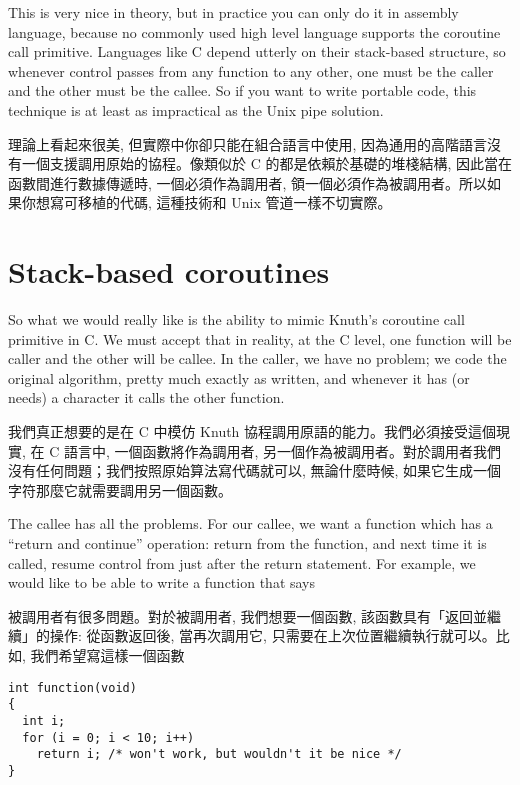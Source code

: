 \documentclass[12pt]{article}
\begin{document}
\begin{CJK}{UTF8}{bsmi}
 This is very nice in theory, but in practice you can only do it in assembly language, because no commonly used high level language supports the coroutine call primitive. Languages like C depend utterly on their stack-based structure, so whenever control passes from any function to any other, one must be the caller and the other must be the callee. So if you want to write portable code, this technique is at least as impractical as the Unix pipe solution.

理論上看起來很美, 但實際中你卻只能在組合語言中使用, 因為通用的高階語言沒有一個支援調用原始的協程。像類似於 C 的都是依賴於基礎的堆棧結構, 因此當在函數間進行數據傳遞時, 一個必須作為調用者, 領一個必須作為被調用者。所以如果你想寫可移植的代碼, 這種技術和 Unix 管道一樣不切實際。

\section{Stack-based coroutines}

So what we would really like is the ability to mimic Knuth's coroutine call primitive in C. We must accept that in reality, at the C level, one function will be caller and the other will be callee. In the caller, we have no problem; we code the original algorithm, pretty much exactly as written, and whenever it has (or needs) a character it calls the other function.

我們真正想要的是在 C 中模仿 Knuth 協程調用原語的能力。我們必須接受這個現實, 在 C 語言中, 一個函數將作為調用者, 另一個作為被調用者。對於調用者我們沒有任何問題；我們按照原始算法寫代碼就可以, 無論什麼時候, 如果它生成一個字符那麼它就需要調用另一個函數。

The callee has all the problems. For our callee, we want a function which has a ``return and continue'' operation: return from the function, and next time it is called, resume control from just after the return statement. For example, we would like to be able to write a function that says


 被調用者有很多問題。對於被調用者, 我們想要一個函數, 該函數具有「返回並繼續」的操作: 從函數返回後, 當再次調用它, 只需要在上次位置繼續執行就可以。比如, 我們希望寫這樣一個函數 

\begin{lstlisting}[basicstyle=\footnotesize, breaklines=true]
int function(void) 
{
  int i;
  for (i = 0; i < 10; i++)
    return i; /* won't work, but wouldn't it be nice */
}
\end{lstlisting}


\end{CJK}
\end{document}
